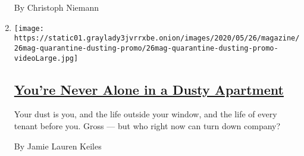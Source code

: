 \begin{enumerate}
  By Christoph Niemann
\item
  \texttt{[image: https://static01.graylady3jvrrxbe.onion/images/2020/05/26/magazine/26mag-quarantine-dusting-promo/26mag-quarantine-dusting-promo-videoLarge.jpg]}

  \hypertarget{youre-never-alone-in-a-dusty-apartment}{%
  \subsection{\texorpdfstring{\href{/interactive/2020/05/19/magazine/covid-quarantine-dust.html}{You're
  Never Alone in a Dusty
  Apartment}}{You're Never Alone in a Dusty Apartment}}\label{youre-never-alone-in-a-dusty-apartment}}

  Your dust is you, and the life outside your window, and the life of
  every tenant before you. Gross --- but who right now can turn down
  company?

  By Jamie Lauren Keiles
\end{enumerate}

